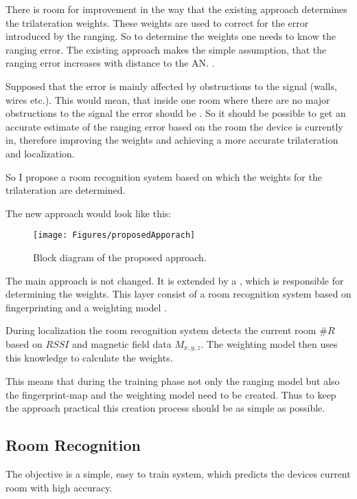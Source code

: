 There is room for improvement in the way that the existing approach determines the trilateration weights. These weights are used to correct for the error introduced by the ranging. So to determine the weights one needs to know the ranging error. The existing approach makes the simple assumption, that the ranging error increases with distance to the AN. .

Supposed that the error is mainly affected by obstructions to the signal (walls, wires etc.). This would mean, that inside one room where there are no major obstructions to the signal the error should be . So it should be possible to get an accurate estimate of the ranging error based on the room the device is currently in, therefore improving the weights and achieving a more accurate trilateration and localization.

So I propose a room recognition system based on which the weights for the trilateration are determined.

\noindent The new approach would look like this:

\begin{figure}[ht]
\centering
\texttt{[image: Figures/proposedApporach]}
\decoRule
\caption[The proposed approach]{Block diagram of the proposed approach.}
\label{fig:proposedApproach}
\end{figure}

The main approach is not changed. It is extended by a , which is responsible for determining the weights. This layer consist of a room recognition system based on fingerprinting and a weighting model .

During localization the room recognition system detects the current room \(\#R\) based on \(RSSI\) and magnetic field data \(M_{x,y,z}\). The weighting model then uses this knowledge to calculate the weights. 

This means that during the training phase not only the ranging model but also the fingerprint-map and the weighting model need to be created. Thus to keep the approach practical this creation process should be as simple as possible.

\subsection{Room Recognition}
The objective is a simple, easy to train system, which predicts the devices current room with high accuracy.

